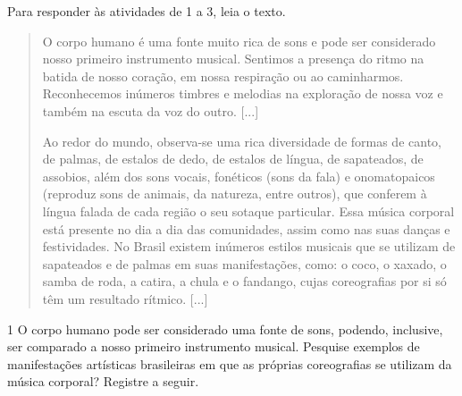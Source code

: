 
Para responder às atividades de 1 a 3, leia o texto.

\begin{quote}
O corpo humano é uma fonte muito rica de sons e pode ser considerado
nosso primeiro instrumento musical. Sentimos a presença do ritmo na
batida de nosso coração, em nossa respiração ou ao caminharmos.
Reconhecemos inúmeros timbres e melodias na exploração de nossa voz e
também na escuta da voz do outro. {[}...{]}

Ao redor do mundo, observa-se uma rica diversidade de formas de canto,
de palmas, de estalos de dedo, de estalos de língua, de sapateados, de
assobios, além dos sons vocais, fonéticos (sons da fala) e onomatopaicos
(reproduz sons de animais, da natureza, entre outros), que conferem à
língua falada de cada região o seu sotaque particular. Essa música
corporal está presente no dia a dia das comunidades, assim como nas suas
danças e festividades. No Brasil existem inúmeros estilos musicais que
se utilizam de sapateados e de palmas em suas manifestações, como: o
coco, o xaxado, o samba de roda, a catira, a chula e o fandango, cujas
coreografias por si só têm um resultado rítmico. {[}...{]}

\end{quote}

\num{1}  O corpo humano pode ser considerado uma fonte de sons, podendo, inclusive, ser comparado a nosso primeiro instrumento musical. Pesquise exemplos de manifestações artísticas brasileiras
  em que as próprias coreografias se utilizam da música corporal? Registre a seguir.


